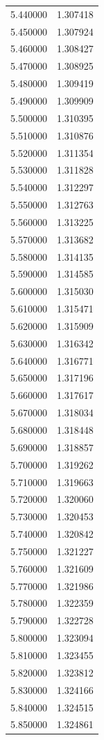 \begin{tabular}{rr}
5.440000 & 1.307418 \\
5.450000 & 1.307924 \\
5.460000 & 1.308427 \\
5.470000 & 1.308925 \\
5.480000 & 1.309419 \\
5.490000 & 1.309909 \\
5.500000 & 1.310395 \\
5.510000 & 1.310876 \\
5.520000 & 1.311354 \\
5.530000 & 1.311828 \\
5.540000 & 1.312297 \\
5.550000 & 1.312763 \\
5.560000 & 1.313225 \\
5.570000 & 1.313682 \\
5.580000 & 1.314135 \\
5.590000 & 1.314585 \\
5.600000 & 1.315030 \\
5.610000 & 1.315471 \\
5.620000 & 1.315909 \\
5.630000 & 1.316342 \\
5.640000 & 1.316771 \\
5.650000 & 1.317196 \\
5.660000 & 1.317617 \\
5.670000 & 1.318034 \\
5.680000 & 1.318448 \\
5.690000 & 1.318857 \\
5.700000 & 1.319262 \\
5.710000 & 1.319663 \\
5.720000 & 1.320060 \\
5.730000 & 1.320453 \\
5.740000 & 1.320842 \\
5.750000 & 1.321227 \\
5.760000 & 1.321609 \\
5.770000 & 1.321986 \\
5.780000 & 1.322359 \\
5.790000 & 1.322728 \\
5.800000 & 1.323094 \\
5.810000 & 1.323455 \\
5.820000 & 1.323812 \\
5.830000 & 1.324166 \\
5.840000 & 1.324515 \\
5.850000 & 1.324861 \\

\end{tabular}
